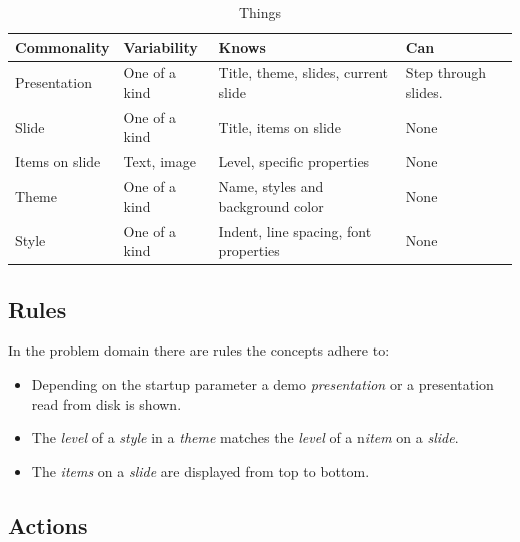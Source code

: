 \documentclass[a4paper]{article}
\begin{document}
\begin{table}[!htpb]
\centering
\begin{tabular}{|l|l|l|l|}
\hline
\textbf{Commonality} & \textbf{Variability} & \textbf{Knows} & \textbf{Can}\\
\hline
\hline
Presentation & One of a kind & Title, theme, slides, current slide & Step through slides.\\
\hline
Slide & One of a kind & Title, items on slide & None\\ 
\hline
Items on slide & Text, image & Level, specific properties & None\\
\hline
Theme & One of a kind & Name, styles and background color & None\\
\hline
Style & One of a kind & Indent, line spacing, font properties & None\\
\hline
\end{tabular}
\caption{Things}
\label{tab:template}
\end{table}

\subsection{Rules}
In the problem domain there are rules the concepts adhere to:
\begin{itemize}
\item{Depending on the startup parameter a demo \textit{presentation} or a presentation read from disk is shown.}
\item{The \textit{level} of a \textit{style} in a \textit{theme} matches the \textit{level} of a n\textit{item} on a \textit{slide}.}
\item{The \textit{items} on a \textit{slide} are displayed from top to bottom.}
\end{itemize}

\subsection{Actions}
\end{document}
